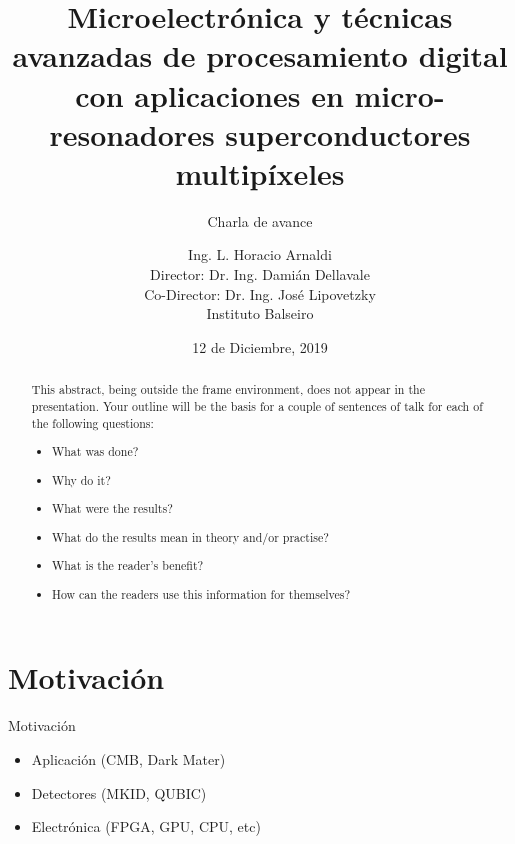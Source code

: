 \documentclass[ignorenonframetext,12pt]{beamer}
\title{Microelectrónica y técnicas avanzadas de procesamiento digital con
aplicaciones en micro-resonadores superconductores multipíxeles}
\subtitle{\alert{Charla de avance}}
\author{Ing. L. Horacio Arnaldi\\
\vspace{0.4cm}
Director: Dr. Ing. Damián Dellavale\\
Co-Director: Dr. Ing. José Lipovetzky\\
\vspace{0.6cm}
Instituto Balseiro}
\date{12 de Diciembre, 2019}
\begin{document}
\begin{frame}
				\maketitle
\end{frame}

\begin{abstract}
				This abstract, being outside the frame environment, does not appear in
				the presentation.  Your outline will be the basis for a couple of
				sentences of talk for each of the following questions:
				\begin{itemize}
								\item What was done?
								\item Why do it?
								\item What were the results?
								\item What do the results mean in theory and/or practise?
								\item What is the reader's benefit?
								\item How can the readers use this information for themselves? 
				\end{itemize}
\end{abstract}


\section{Motivación}
\begin{frame}{Motivación}
				\begin{itemize}
								\item Aplicación (CMB, Dark Mater)
								\item Detectores (MKID, QUBIC)
								\item Electrónica (FPGA, GPU, CPU, etc)
				\end{itemize}
\end{frame}
\end{document}
